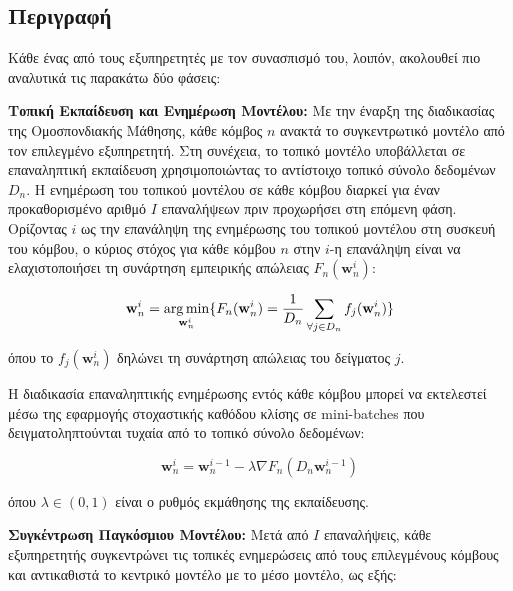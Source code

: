 \subsection{Περιγραφή}

Κάθε ένας από τους εξυπηρετητές με τον συνασπισμό του, λοιπόν, ακολουθεί πιο αναλυτικά τις παρακάτω δύο φάσεις:

\textbf{Τοπική Εκπαίδευση και Ενημέρωση Μοντέλου:} Με την έναρξη της διαδικασίας της Ομοσπονδιακής Μάθησης, κάθε κόμβος $n$ ανακτά το συγκεντρωτικό μοντέλο από τον επιλεγμένο εξυπηρετητή. Στη συνέχεια, το τοπικό μοντέλο υποβάλλεται σε επαναληπτική εκπαίδευση χρησιμοποιώντας το αντίστοιχο τοπικό σύνολο δεδομένων $D_n$. Η ενημέρωση του τοπικού μοντέλου σε κάθε κόμβου διαρκεί για έναν προκαθορισμένο αριθμό $I$ επαναλήψεων πριν προχωρήσει στη επόμενη φάση. Ορίζοντας $i$ ως την επανάληψη της ενημέρωσης του τοπικού μοντέλου στη συσκευή του κόμβου, ο κύριος στόχος για κάθε κόμβου $n$ στην $i$-η επανάληψη είναι να ελαχιστοποιήσει τη συνάρτηση εμπειρικής απώλειας $F_n(\mathbf{w}_n^i)$:

\vspace{-5pt}

\begin{equation}
   \mathbf{w}_n^i=\operatorname*{arg\,min}\limits_{\mathbf{w}_n^i} \{F_n(\mathbf{w}_n^i)=\frac{1}{D_n}\sum\limits_{\forall j\in D_n}f_j(\mathbf{w}_n^i)\}
    \label{eq13}
\end{equation}

\vspace{-5pt}

\noindent
όπου το $f_j(\mathbf{w}_n^i)$ δηλώνει τη συνάρτηση απώλειας του δείγματος $j$.

Η διαδικασία επαναληπτικής ενημέρωσης εντός κάθε κόμβου μπορεί να εκτελεστεί μέσω της εφαρμογής στοχαστικής καθόδου κλίσης σε mini-batches που δειγματοληπτούνται τυχαία από το τοπικό σύνολο δεδομένων:

\vspace{-5pt}
\begin{equation}
   \mathbf{w}_n^i=\mathbf{w}_n^{i-1}-\lambda \nabla F_n(D_n \mathbf{w}_n^{i-1})
    \label{eq14}
\end{equation}

\vspace{-5pt}

\noindent
όπου $\lambda \in (0,1)$ είναι ο ρυθμός εκμάθησης της εκπαίδευσης.

\textbf{Συγκέντρωση Παγκόσμιου Μοντέλου:} Μετά από $I$ επαναλήψεις, κάθε εξυπηρετητής συγκεντρώνει τις τοπικές ενημερώσεις από τους επιλεγμένους κόμβους και αντικαθιστά το κεντρικό μοντέλο με το μέσο μοντέλο, ως εξής:

